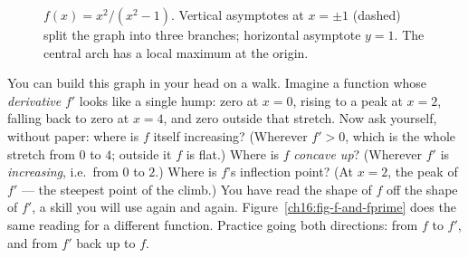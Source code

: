 \begin{figure}[H]
\centering
{}
\caption{$f(x)=x^2/(x^2-1)$. Vertical asymptotes at $x=\pm1$ (dashed) split the
graph into three branches; horizontal asymptote $y=1$. The central arch has a local
maximum at the origin.}
\label{ch16:fig-rational}
\end{figure}

\begin{walkbox}
You can build this graph in your head on a walk. Imagine a function
whose \emph{derivative} $f'$ looks like a single hump: zero at $x=0$, rising to a
peak at $x=2$, falling back to zero at $x=4$, and zero outside that stretch. Now
ask yourself, without paper: where is $f$ itself increasing? (Wherever $f'>0$,
which is the whole stretch from $0$ to $4$; outside it $f$ is flat.) Where is $f$
\emph{concave up}? (Wherever $f'$ is \emph{increasing}, i.e.\ from $0$ to $2$.)
Where is $f$'s inflection point? (At $x=2$, the peak of $f'$ --- the steepest point
of the climb.) You have read the shape of $f$ off the shape of $f'$, a skill you
will use again and again. Figure~\ref{ch16:fig-f-and-fprime} does the same
reading for a different function. Practice going both directions: from
$f$ to $f'$, and from $f'$ back up to $f$.
\end{walkbox}

